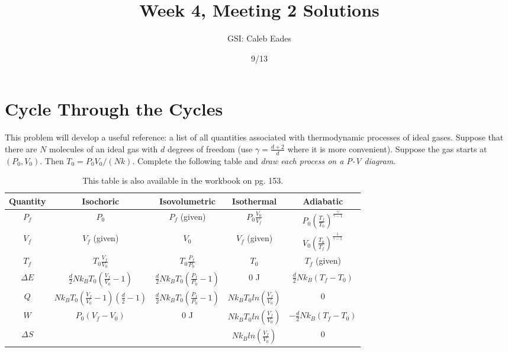 \documentclass{article}
\begin{document}
\title{Week 4, Meeting 2 Solutions}
\author{GSI: Caleb Eades}
\date{9/13}
\maketitle

\section{Cycle Through the Cycles}

This problem will develop a useful reference: a list of all quantities associated with thermodynamic processes of ideal gases. Suppose that there are $N$ molecules of an ideal gas with $d$ degrees of freedom (use $\gamma = \frac{d+2}{d}$ where it is more convenient). Suppose the gas starts at $(P_0,V_0)$. Then $T_0 = P_0V_0/(Nk)$. Complete the following table and \textit{draw each process on a P-V diagram}.

\def\arraystretch{2.5}
\begin{table}[h]
	\begin{center}
	\caption{This table is also available in the workbook on pg. 153.}
	
	\begin{tabular}{| >{\Large}c|c|c|c|c|}
		\hline
		\normalsize{\textbf{Quantity}} & \textbf{Isochoric} & \textbf{Isovolumetric} & \textbf{Isothermal} & \textbf{Adiabatic} \\ \hline
		$P_f$             & $P_0$             & $P_f$ (given)          & $P_0\frac{V_0}{V_f}$& $P_0\left(\frac{T_f}{T_0}\right)^{\frac{\gamma}{\gamma-1}}$                   \\ \hline
		$V_f$             & $V_f$ (given)     & $V_0$                  & $V_f$ (given)       & $V_0\left(\frac{T_0}{T_f}\right)^{\frac{1}{\gamma-1}}$                   \\ \hline
		$T_f$             & $T_0\frac{V_f}{V_0}$& $T_0\frac{P_f}{P_0}$ & $T_0$               & $T_f$ (given)      \\ \hline
		$\Delta E$        & $\frac{d}{2}Nk_BT_0\left(\frac{V_f}{V_0}-1\right)$ & $\frac{d}{2}Nk_BT_0\left(\frac{P_f}{P_0}-1\right)$                       & $0$ J                 & $\frac{d}{2}Nk_B(T_f-T_0)$                   \\ \hline
		$Q$               & $Nk_BT_0\left(\frac{V_f}{V_0}-1\right)\left(\frac{d}{2}-1\right)$                  & $\frac{d}{2}Nk_BT_0\left(\frac{P_f}{P_0}-1\right)$                       & $Nk_BT_0ln\left(\frac{V_f}{V_0}\right)$                    & $0$                   \\ \hline
		$W$               & $P_0(V_f-V_0)$                  & $0$ J                      & $Nk_BT_0ln\left(\frac{V_f}{V_0}\right)$                    & $-\frac{d}{2}Nk_B(T_f-T_0)$                   \\ \hline
		$\Delta S$        &                   &                        & $Nk_Bln\left(\frac{V_f}{V_0}\right)$                    & $0$                    \\ \hline
	\end{tabular}
	\end{center}
\end{table}
\end{document}
